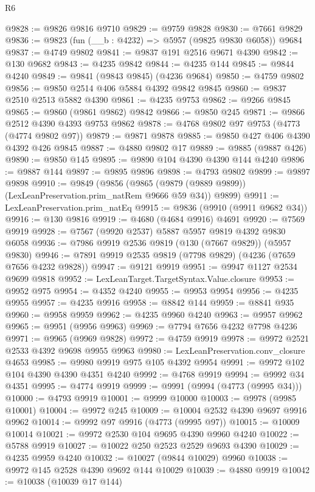 \begin{lexlean}{R6}
\begin{coremodule}
@9828 := @9826 @9816 @9710
@9829 := @9759 @9828
@9830 := @7661 @9829
@9836 := @9823 (fun (__b : @4232) => @5957 (@9825 @9830 @6058)) @9684
@9837 := @4749 @9802
@9841 := @9837 @191 @2516 @9671 @4390
@9842 := @130 @9682
@9843 := @4235 @9842
@9844 := @4235 @144
@9845 := @9844 @4240
@9849 := @9841 (@9843 @9845) (@4236 @9684)
@9850 := @4759 @9802
@9856 := @9850 @2514 @406 @5884 @4392 @9842 @9845
@9860 := @9837 @2510 @2513 @5882 @4390
@9861 := @4235 @9753
@9862 := @9266 @9845
@9865 := @9860 (@9861 @9862) @9842
@9866 := @9850 @245
@9871 := @9866 @2512 @4390 @4393 @9753 @9862
@9878 := @4768 @9802 @97 @9753 (@4773 (@4774 @9802 @97))
@9879 := @9871 @9878
@9885 := @9850 @427 @406 @4390 @4392 @426 @9845
@9887 := @4880 @9802 @17
@9889 := @9885 (@9887 @426)
@9890 := @9850 @145
@9895 := @9890 @104 @4390 @4390 @144 @4240
@9896 := @9887 @144
@9897 := @9895 @9896
@9898 := @4793 @9802
@9899 := @9897 @9898
@9910 := @9849
    (@9856 (@9865 (@9879 (@9889 @9899)) (LexLeanPreservation.prim_natRem @9666 @59 @34)) @9899)
@9911 := LexLeanPreservation.prim_natEq
@9915 := @9836 (@9910 (@9911 @9682 @34))
@9916 := @130 @9816
@9919 := @4680 (@4684 @9916) @4691
@9920 := @7569 @9919
@9928 := @7567 (@9920 @2537) @5887 @5957 @9819 @4392 @9830 @6058
@9936 := @7986 @9919 @2536 @9819 (@130 (@7667 @9829)) (@5957 @9830)
@9946 := @7891 @9919 @2535 @9819 (@7798 @9829) (@4236 (@7659 @7656 @4232 @9828))
@9947 := @9121 @9919
@9951 := @9947 @1127 @2534 @9699 @9818
@9952 := LexLeanTarget.TargetSyntax.Value.closure
@9953 := @9952 @975
@9954 := @4352 @4240
@9955 := @9953 @9954
@9956 := @4235 @9955
@9957 := @4235 @9916
@9958 := @8842 @144
@9959 := @8841 @935
@9960 := @9958 @9959
@9962 := @4235 @9960 @4240
@9963 := @9957 @9962
@9965 := @9951 (@9956 @9963)
@9969 := @7794 @7656 @4232 @7798 @4236
@9971 := @9965 (@9969 @9828)
@9972 := @4759 @9919
@9978 := @9972 @2521 @2533 @4392 @9698 @9955 @9963
@9980 := LexLeanPreservation.conv_closure @4653
@9985 := @9980 @9919 @975 @105 @4392 @9954
@9991 := @9972 @102 @104 @4390 @4390 @4351 @4240
@9992 := @4768 @9919
@9994 := @9992 @34 @4351
@9995 := @4774 @9919
@9999 := @9991 (@9994 (@4773 (@9995 @34)))
@10000 := @4793 @9919
@10001 := @9999 @10000
@10003 := @9978 (@9985 @10001)
@10004 := @9972 @245
@10009 := @10004 @2532 @4390 @9697 @9916 @9962
@10014 := @9992 @97 @9916 (@4773 (@9995 @97))
@10015 := @10009 @10014
@10021 := @9972 @2530 @104 @9695 @4390 @9960 @4240
@10022 := @5788 @9919
@10027 := @10022 @250 @2523 @2529 @9693 @4390
@10029 := @4235 @9959 @4240
@10032 := @10027 (@9844 @10029) @9960
@10038 := @9972 @145 @2528 @4390 @9692 @144 @10029
@10039 := @4880 @9919
@10042 := @10038 (@10039 @17 @144)

\end{coremodule}
\end{lexlean}
